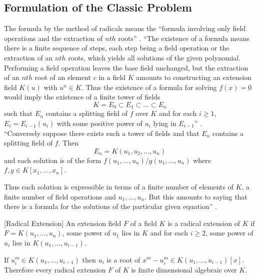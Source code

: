 \subsection{Formulation of the Classic Problem}
The formula by the method of radicals means the ``formula involving only field operations and the extraction of \(nth\) roots'' \cite{hunger}.
``The existence of a formula means there is a finite sequence of steps, each step being a field operation or the extraction of an \(nth\) roots, which yields all solutions of the given polynomial.
Performing a field operation leaves the base field unchanged, but the extraction of an \(nth\) root of an element
\(c\) in a field \(K\) amounts to constructing an extension field \(K(u)\) with \(u^n \in K\). Thus the existence of a formula for solving \(f(x)=0\) would imply
the existence of a finite tower of fields
\[K=E_0 \subset E_1 \subset ... \subset E_n\]
such that \(E_n\) contains a splitting field of \(f\) over \(K\) and for each \(i \geq 1\), \(E_i=E_{i-1}(u_i)\) with some positive power of \(u_i\) lying in \(E_{i-1}\)'' \cite{hunger}.\\
``Conversely suppose there exists such a tower of fields and that \(E_n\) contains a splitting field of \(f\). Then
\[E_n = K(u_1,u_2,...,u_n)\]
and each solution is of the form \(f(u_1,...,u_n)/g(u_1,...,u_n)\) where \(f,g \in K[x_1,...,x_n]\).

Thus each solution is expressible in terms of a finite number of elements of \(K\), a finite number of field operations and \(u_1,...,u_n\). But
this amounts to saying that there is a formula for the solutions of the particular given equation'' \cite{hunger}.
\vspace{3mm}

\begin{definition} \cite{hunger} [Radical Extension]
An extension field \(F\) of a field \(K\) is a radical extension of \(K\) if \(F=K(u_1,...,u_n)\), some power of \(u_1\) lies in \(K\) and for each \(i \geq 2\), some power of \(u_i\) lies in \(K(u_1,...,u_{i-1})\).
\end{definition}

\vspace{3mm}
\begin{remark} \cite{hunger}
If \(u_i^m \in K(u_1,...,u_{i-1})\) then \(u_i\) is a root of \(x^m-u_i^m \in K(u_1,...,u_{i-1})[x]\). \\
Therefore every radical extension \(F\) of \(K\) is finite dimensional algebraic over \(K\).
\end{remark}
\vspace{3mm}

